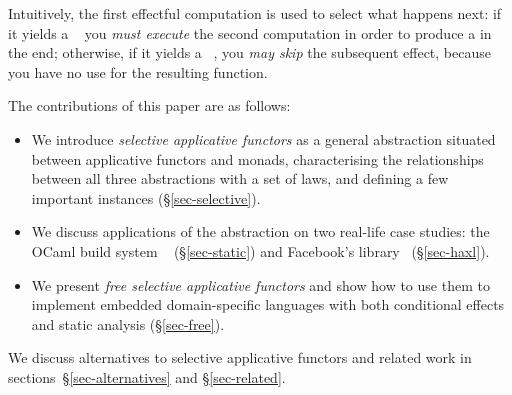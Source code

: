 \noindent
Intuitively, the first effectful computation is used to select what happens
next: if it yields a ~ you \emph{must execute} the second
computation in order to produce a  in the end; otherwise, if it yields a
~, you \emph{may skip} the subsequent effect, because you have
no use for the resulting function.

\noindent
The contributions of this paper are as follows:

\begin{itemize}
    \item We introduce \emph{selective applicative functors} as a general
    abstraction situated between applicative functors and monads, characterising
    the relationships between all three abstractions with a set of laws, and
    defining a few important instances (\S\ref{sec-selective}).
    \item We discuss applications of the abstraction on two real-life case
    studies: the OCaml build system \Dune~\citep{dune} (\S\ref{sec-static}) and
    Facebook's \Haxl library~\cite{marlow2014haxl} (\S\ref{sec-haxl}).
    \item We present \emph{free selective applicative functors} and show how to
    use them to implement embedded domain-specific languages with both
    conditional effects and static analysis (\S\ref{sec-free}).
\end{itemize}

\noindent
We discuss alternatives to selective applicative functors and related work in
sections~\S\ref{sec-alternatives} and \S\ref{sec-related}.
